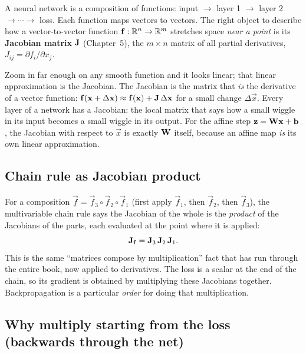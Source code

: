 A neural network is a composition of functions: input $\to$ layer 1 $\to$ layer 2 $\to
\cdots \to$ loss. Each function maps vectors to vectors. The right object to describe how a
vector-to-vector function $\mathbf{f}:\mathbb{R}^{n}\to\mathbb{R}^{m}$ stretches space \emph{near a point} is
its \textbf{Jacobian matrix} $\mathbf{J}$ (Chapter~5), the $m\times n$ matrix of all partial
derivatives, $J_{ij}=\partial f_i/\partial x_j$.

\begin{intuitionbox}
Zoom in far enough on any smooth function and it looks linear; that linear approximation
is the Jacobian. The Jacobian is the matrix that \emph{is} the derivative of a vector
function: $\mathbf{f}(\mathbf{x}+\Delta\mathbf{x}) \approx \mathbf{f}(\mathbf{x}) + \mathbf{J}\,\Delta\mathbf{x}$
for a small change $\Delta\vec{x}$.
Every layer of a network has a Jacobian: the local matrix that says how a small wiggle
in its input becomes a small wiggle in its output. For the affine step
$\mathbf{z}=\mathbf{W}\mathbf{x}+\mathbf{b}$, the Jacobian with respect to $\vec{x}$ is exactly
$\mathbf{W}$ itself, because an affine map \emph{is} its own linear approximation.
\end{intuitionbox}

\subsection{Chain rule as Jacobian product}

For a composition $\vec{f} = \vec{f}_3 \circ \vec{f}_2 \circ \vec{f}_1$ (first apply
$\vec{f}_1$, then $\vec{f}_2$, then $\vec{f}_3$), the multivariable
chain rule says the Jacobian of the whole is the \emph{product} of the Jacobians of the
parts, each evaluated at the point where it is applied:
\[
\mathbf{J}_{\mathbf{f}} = \mathbf{J}_{3}\,\mathbf{J}_{2}\,\mathbf{J}_{1}.
\]
This is the same ``matrices compose by multiplication'' fact that has run through the
entire book, now applied to derivatives. The loss is a scalar at the end of the chain, so
its gradient is obtained by multiplying these Jacobians together. Backpropagation is a
particular \emph{order} for doing that multiplication.

\subsection{Why multiply starting from the loss (backwards through the net)}

